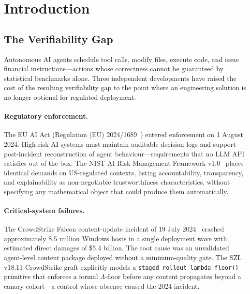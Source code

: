 \documentclass[11pt,letterpaper]{article}
\theoremstyle{definition}
\theoremstyle{remark}
\begin{document}
\section{Introduction}
\label{sec:intro}

\subsection{The Verifiability Gap}

Autonomous AI agents schedule tool calls, modify files, execute code,
and issue financial instructions---actions whose correctness cannot be
guaranteed by statistical benchmarks alone.
Three independent developments have raised the cost of the resulting
verifiability gap to the point where an engineering solution is
no longer optional for regulated deployment.

\paragraph{Regulatory enforcement.}
The EU AI Act (Regulation (EU) 2024/1689~\cite{EUAIAct2024}) entered
enforcement on 1 August 2024.
High-risk AI systems must maintain auditable decision logs and support
post-incident reconstruction of agent behaviour---requirements that no
LLM API satisfies out of the box.
The NIST AI Risk Management Framework v1.0~\cite{NIST2023AI} places
identical demands on US-regulated contexts, listing accountability,
transparency, and explainability as non-negotiable trustworthiness
characteristics, without specifying any mathematical object that could
produce them automatically.

\paragraph{Critical-system failures.}
The CrowdStrike Falcon content-update incident of 19 July
2024~\cite{CrowdStrike2024} crashed approximately 8.5 million Windows
hosts in a single deployment wave with estimated direct damages of
\$5.4 billion.
The root cause was an unvalidated agent-level content package deployed
without a minimum-quality gate.
The SZL v18.11 CrowdStrike graft explicitly models a
\texttt{staged\_rollout\_lambda\_floor()} primitive that enforces a
formal \(\Lambda\)-floor before any content propagates beyond a canary
cohort---a control whose absence caused the 2024 incident.
\end{document}
